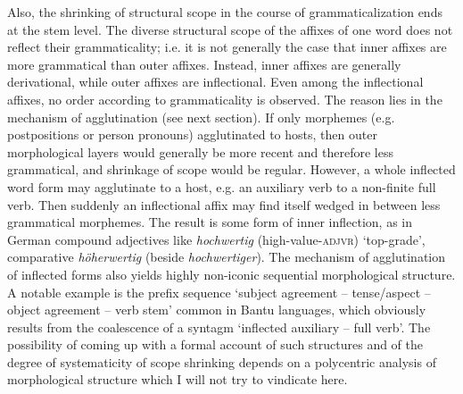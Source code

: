 Also, the shrinking of structural scope in the course of grammaticalization ends at the stem level. The diverse structural scope of the affixes of one word does not reflect their grammaticality; i.e. it is not generally the case that inner affixes are more grammatical than outer affixes. Instead, inner affixes are generally derivational, while outer affixes are inflectional. Even among the inflectional affixes, no order according to grammaticality is observed. The reason lies in the mechanism of agglutination (see next section). If only morphemes (e.g. postpositions or person pronouns) agglutinated to hosts, then outer morphological layers would generally be more recent and therefore less grammatical, and shrinkage of scope would be regular. However, a whole inflected word form may agglutinate to a host, e.g. an auxiliary verb to a non-finite full verb. Then suddenly an inflectional affix may find itself wedged in between less grammatical morphemes. The result is some form of inner inflection, as in German compound adjectives like \textit{hochwertig} (high-value-\textsc{adjvr}) ‘top-grade’, comparative \textit{höherwertig} (beside \textit{hochwertiger}). The mechanism of agglutination of inflected forms also yields highly non-iconic sequential morphological structure. A notable example is the prefix sequence ‘subject agreement -- tense/aspect -- object agreement -- verb stem’ common in Bantu languages, which obviously results from the coalescence of a syntagm ‘inflected auxiliary -- full verb’. The possibility of coming up with a formal account of such structures and of the degree of systematicity of scope shrinking depends on a polycentric analysis of morphological structure which I will not try to vindicate here.

